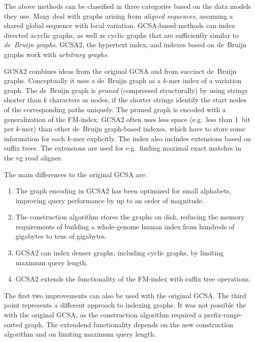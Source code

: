 \documentclass[twoside,leqno,twocolumn]{article}
\newcommand{\kmer}[1]{$#1$\nobreakdash-mer}
\begin{document}
The above methods can be classified in three categories based on the data models they use. Many deal with graphs arising from \emph{aligned sequences}, assuming a shared global sequence with local variation. GCSA-based methods can index directed acyclic graphs, as well as cyclic graphs that are sufficiently similar to \emph{de~Bruijn graphs}. GCSA2, the hypertext index, and indexes based on de~Bruijn graphs work with \emph{arbitrary graphs}.

GCSA2 combines ideas from the original GCSA and from succinct de~Bruijn graphs. Conceptually it uses a de~Bruijn graph as a \kmer{k} index of a variation graph. The de~Bruijn graph is \emph{pruned} (compressed structurally) by using strings shorter than $k$ characters as nodes, if the shorter strings identify the start nodes of the corresponding paths uniquely. The pruned graph is encoded with a generalization of the FM\nobreakdash-index. GCSA2 often uses less space (e.g.~less than 1~bit per \kmer{k}) than other de~Bruijn graph-based indexes, which have to store some information for each \kmer{k} explicitly. The index also includes extensions based on suffix trees. The extensions are used for e.g.~finding maximal exact matches in the vg read aligner.

The main differences to the original GCSA are:
\begin{enumerate}

\item The graph encoding in GCSA2 has been optimized for small alphabets, improving query performance by up to an order of magnitude.

\item The construction algorithm stores the graphs on disk, reducing the memory requirements of building a whole-genome human index from hundreds of gigabytes to tens of gigabytes.

\item GCSA2 can index denser graphs, including cyclic graphs, by limiting maximum query length.

\item GCSA2 extends the functionality of the FM-index with suffix tree operations.

\end{enumerate}
The first two improvements can also be used with the original GCSA. The third point represents a different approach to indexing graphs. It was not possible the with the original GCSA, as the construction algorithm required a prefix-range-sorted graph. The extendend functionality depends on the new construction algorithm and on limiting maximum query length.
\end{document}
